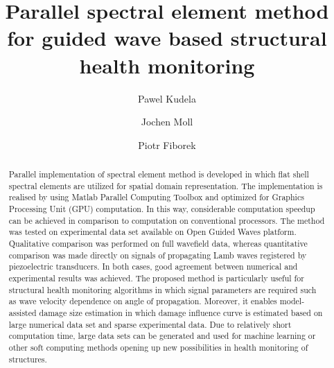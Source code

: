 \documentclass[preprint,12pt]{elsarticle}
\begin{document}
	\begin{frontmatter}
		
		\title{Parallel spectral element method for guided wave based structural health monitoring}
		
		\address[IFFM]{Institute of Fluid Flow Machinery, Polish Academy of Sciences, Poland}
		\address[GU]{J.W. Goethe--University, Department of Physics, 60438 Frankfurt, Germany}
		
		
		\author{Pawel Kudela}
		\author{Jochen Moll}
		\author{Piotr Fiborek }
		
		
		\begin{abstract}
			Parallel implementation of spectral element method is developed in which flat shell spectral elements are utilized for spatial domain representation. The implementation is realised by using Matlab Parallel Computing Toolbox and optimized for Graphics Processing Unit (GPU) computation. In this way, considerable computation speedup can be achieved in comparison to computation on conventional processors. The method was tested on experimental data set available on Open Guided Waves platform. Qualitative comparison was performed on full wavefield data, whereas quantitative comparison was made directly on signals of propagating Lamb waves registered by piezoelectric transducers. In both cases, good agreement between numerical and experimental results was achieved. The proposed method is particularly useful for structural health monitoring algorithms in which signal parameters are required such as wave velocity dependence on angle of propagation. Moreover, it enables model-assisted damage size estimation in which damage influence curve is estimated based on large numerical data set and sparse experimental data. Due to relatively short computation time, large data sets can be generated and used for machine learning or other soft computing methods opening up new possibilities in health monitoring of structures.
		\end{abstract}
		

\end{frontmatter}
\end{document}

